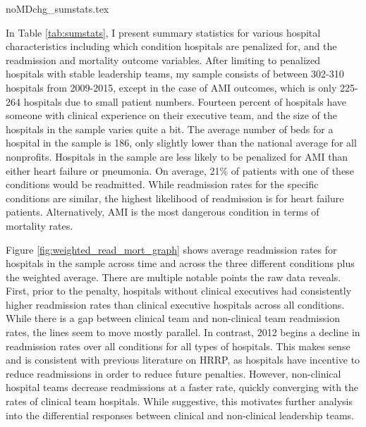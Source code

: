 \documentclass[12pt]{article}
\begin{document}
    {noMDchg_sumstats.tex}

    In Table \ref{tab:sumstats}, I present summary statistics for various hospital characteristics including which condition hospitals are penalized for, and the readmission and mortality outcome variables. After limiting to penalized hospitals with stable leadership teams, my sample consists of between 302-310 hospitals from 2009-2015, except in the case of AMI outcomes, which is only 225-264 hospitals due to small patient numbers. Fourteen percent of hospitals have someone with clinical experience on their executive team, and the size of the hospitals in the sample varies quite a bit. The average number of beds for a hospital in the sample is 186, only slightly lower than the national average for all nonprofits. Hospitals in the sample are less likely to be penalized for AMI than either heart failure or pneumonia. On average, 21\% of patients with one of these conditions would be readmitted. While readmission rates for the specific conditions are similar, the highest likelihood of readmission is for heart failure patients. Alternatively, AMI is the most dangerous condition in terms of mortality rates. 

    Figure \ref{fig:weighted_read_mort_graph} shows average readmission rates for hospitals in the sample across time and across the three different conditions plus the weighted average. There are multiple notable points the raw data reveals. First, prior to the penalty, hospitals without clinical executives had consistently higher readmission rates than clinical executive hospitals across all conditions. While there is a gap between clinical team and non-clinical team readmission rates, the lines seem to move mostly parallel. In contrast, 2012 begins a decline in readmission rates over all conditions for all types of hospitals. This makes sense and is consistent with previous literature on HRRP, as hospitals have incentive to reduce readmissions in order to reduce future penalties. However, non-clinical hospital teams decrease readmissions at a faster rate, quickly converging with the rates of clinical team hospitals. While suggestive, this motivates further analysis into the differential responses between clinical and non-clinical leadership teams. 
\end{document}
